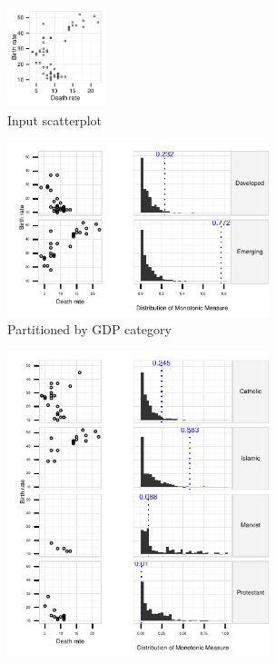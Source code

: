 \begin{figure}[t]
 \centering 
	 \begin{subfigure}{1.15in}
        \centering
		\includegraphics[width=1.15in]{images/DEATH_RT-BIRTH_RT.pdf}
        \vspace{-0.5cm}
		  \caption{Input scatterplot}
        \vspace{0.25cm}
		 \label{fig:informative_all}
	\end{subfigure}
	\begin{subfigure}{3in}
		\includegraphics[width=3in]{images/9_95670214716782-GDP.pdf}
        \vspace{-0.5cm}
		  \caption{Partitioned by GDP category}
        \vspace{0.25cm}
		 \label{fig:informative}
	 \end{subfigure}
	 \begin{subfigure}{3in}
		\includegraphics[width=3in]{images/3_80130820585327-LEADER.pdf}

\end{subfigure}
\end{figure}
